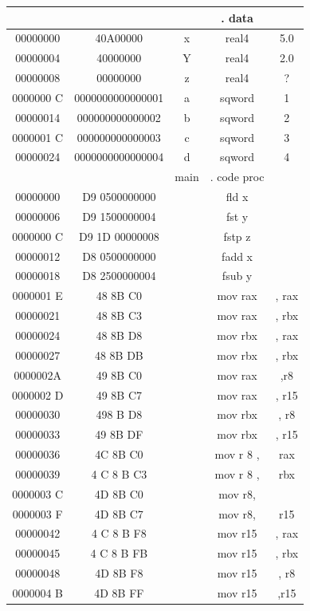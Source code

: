 \documentclass[10pt]{book}
\begin{document}
\begin{center}
\begin{center}
\begin{center}
\begin{center}
\begin{center}
\begin{center}
\begin{tabular}{|c|c|c|c|c|}
\hline
 &  &  & . data &  \\
\hline
00000000 & 40A00000 & x & real4 & 5.0 \\
\hline
00000004 & 40000000 & Y & real4 & 2.0 \\
\hline
00000008 & 00000000 & z & real4 & ? \\
\hline
0000000 C & 0000000000000001 & a & sqword & 1 \\
\hline
00000014 & 000000000000002 & b & sqword & 2 \\
\hline
0000001 C & 000000000000003 & c & sqword & 3 \\
\hline
00000024 & 0000000000000004 & d & sqword & 4 \\
\hline
 &  & main & . code proc &  \\
\hline
00000000 & D9 0500000000 &  & fld x &  \\
\hline
00000006 & D9 1500000004 &  & fst y &  \\
\hline
0000000 C & D9 1D 00000008 &  & fstp z &  \\
\hline
00000012 & D8 0500000000 &  & fadd x &  \\
\hline
00000018 & D8 2500000004 &  & fsub y &  \\
\hline
0000001 E & 48 8B C0 &  & mov rax & , rax \\
\hline
00000021 & 48 8B C3 &  & mov rax & , rbx \\
\hline
00000024 & 48 8B D8 &  & mov rbx & , rax \\
\hline
00000027 & 48 8B DB &  & mov rbx & , rbx \\
\hline
0000002A & 49 8B C0 &  & mov rax & ,r8 \\
\hline
0000002 D & 49 8B C7 &  & mov rax & , r15 \\
\hline
00000030 & 498 B D8 &  & mov rbx & , r8 \\
\hline
00000033 & 49 8B DF &  & mov rbx & , r15 \\
\hline
00000036 & 4C 8B C0 &  & mov r 8 , & rax \\
\hline
00000039 & 4 C 8 B C3 &  & mov r 8 , & rbx \\
\hline
0000003 C & 4D 8B C0 &  & mov r8, &  \\
\hline
0000003 F & 4D 8B C7 &  & mov r8, & r15 \\
\hline
00000042 & 4 C 8 B F8 &  & mov r15 & , rax \\
\hline
00000045 & 4 C 8 B FB &  & mov r15 & , rbx \\
\hline
00000048 & 4D 8B F8 &  & mov r15 & , r8 \\
\hline
0000004 B & 4D 8B FF &  & mov r15 & ,r15 \\
\hline
\end{tabular}
\end{center}


\end{center}
\end{center}
\end{center}
\end{center}
\end{center}
\end{document}
